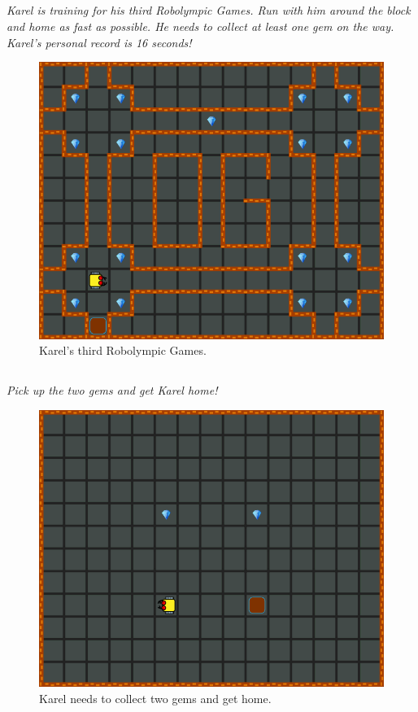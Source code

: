 \documentclass[article,A4,12pt]{llncs}
\begin{document}
\subsection{}

{\em Karel is training for his third Robolympic Games. Run with him around the block and home as fast as possible. He needs to collect at least one gem on the way. Karel's personal record is 16 seconds!}

\begin{figure}[!ht]
\begin{center}
\includegraphics[height=0.4\textwidth]{imgk/a06.png}
\end{center}
\vspace{-4mm}
\caption{Karel's third Robolympic Games.}
\label{fig:a06}
\vspace{-1cm}
\end{figure}
\noindent


\subsection{}

{\em Pick up the two gems and get Karel home!}

\begin{figure}[!ht]
\begin{center}
\includegraphics[height=0.4\textwidth]{imgk/a07.png}
\end{center}
\vspace{-4mm}
\caption{Karel needs to collect two gems and get home.}
\label{fig:a07}
\vspace{-1cm}
\end{figure}
\noindent
\end{document}
